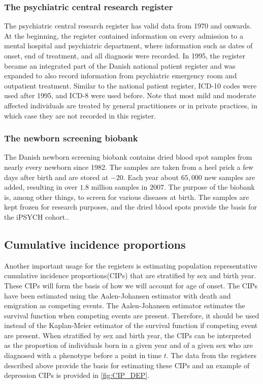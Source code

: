 \subsubsection{The psychiatric central research register}
The psychiatric central research register has valid data from 1970 and onwards. At the beginning, the register contained information on every admission to a mental hospital and psychiatric department, where information such as dates of onset, end of treatment, and all diagnosis were recorded. In 1995, the register became an integrated part of the Danish national patient register and was expanded to also record information from psychiatric emergency room and outpatient treatment. Similar to the national patient register, ICD-10 codes were used after 1995, and ICD-8 were used before. Note that most mild and moderate affected individuals are treated by general practitioners or in private practices, in which case they are not recorded in this register.\cite{mors2011danish}


\subsubsection{The newborn screening biobank}
The Danish newborn screening biobank contains dried blood spot samples from 
nearly every newborn since 1982. The samples are taken from a heel prick a few 
days after birth and are stored at $ -20 $\textcelsius. Each year about $ 
65,000 $ new samples are added, resulting in over $ 1.8 $ million samples in $ 
2007 $. The purpose of the biobank is, among other things, to screen for 
various diseases at birth. The samples are kept frozen for research purposes, 
and the dried blood spots provide the basis for the iPSYCH cohort.\cite{norgaard2007storage}.

\subsection{Cumulative incidence proportions}
Another important usage for the registers is estimating population 
representative cumulative incidence proportions(CIPs) that are stratified by 
sex and birth year. These CIPs will form the basis of how we will account for 
age of onset. The CIPs have been estimated using the Aalen-Johansen 
estimator\cite{hansen2017estimating} with death and emigration as competing 
events. The Aalen-Johansen estimator estimates the survival function when 
competing events are present. Therefore, it should be used instead of the 
Kaplan-Meier estimator of the survival function if competing event are present. 
When stratified by sex and birth year, the CIPs can be interpreted as the 
proportion of individuals born in a given year and of a given sex who are 
diagnosed with a phenotype before a point in time $ t $. The data from the 
registers described above provide the basis for estimating these CIPs and an 
example of depression CIPs is provided in \cref{fig:CIP_DEP}.

